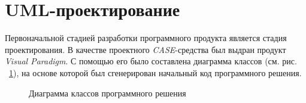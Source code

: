 \section{UML-проектирование}

Первоначальной стадией разработки программного продукта является стадия проектирования.
В качестве проектного {\it CASE}-средства был выдран продукт {\it Visual Paradigm}.
С помощью его было составлена диаграмма классов (см. рис. ~\ref{ris:UML}), на основе которой был сгенерирован начальный код программного решения.

\begin{figure}[h]
\caption{Диаграмма классов программного решения}
\label{ris:UML}
\end{figure}